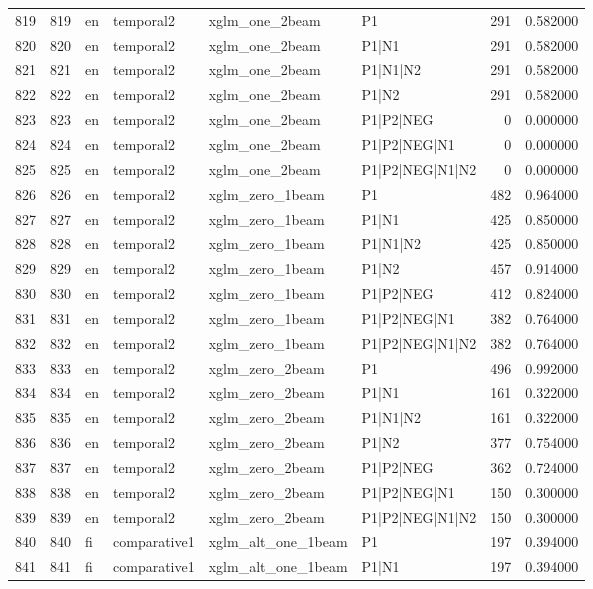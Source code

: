 \begin{tabular}{lrllllrr}
819 & 819 & en & temporal2 & xglm_one_2beam & P1 & 291 & 0.582000 \\
820 & 820 & en & temporal2 & xglm_one_2beam & P1|N1 & 291 & 0.582000 \\
821 & 821 & en & temporal2 & xglm_one_2beam & P1|N1|N2 & 291 & 0.582000 \\
822 & 822 & en & temporal2 & xglm_one_2beam & P1|N2 & 291 & 0.582000 \\
823 & 823 & en & temporal2 & xglm_one_2beam & P1|P2|NEG & 0 & 0.000000 \\
824 & 824 & en & temporal2 & xglm_one_2beam & P1|P2|NEG|N1 & 0 & 0.000000 \\
825 & 825 & en & temporal2 & xglm_one_2beam & P1|P2|NEG|N1|N2 & 0 & 0.000000 \\
826 & 826 & en & temporal2 & xglm_zero_1beam & P1 & 482 & 0.964000 \\
827 & 827 & en & temporal2 & xglm_zero_1beam & P1|N1 & 425 & 0.850000 \\
828 & 828 & en & temporal2 & xglm_zero_1beam & P1|N1|N2 & 425 & 0.850000 \\
829 & 829 & en & temporal2 & xglm_zero_1beam & P1|N2 & 457 & 0.914000 \\
830 & 830 & en & temporal2 & xglm_zero_1beam & P1|P2|NEG & 412 & 0.824000 \\
831 & 831 & en & temporal2 & xglm_zero_1beam & P1|P2|NEG|N1 & 382 & 0.764000 \\
832 & 832 & en & temporal2 & xglm_zero_1beam & P1|P2|NEG|N1|N2 & 382 & 0.764000 \\
833 & 833 & en & temporal2 & xglm_zero_2beam & P1 & 496 & 0.992000 \\
834 & 834 & en & temporal2 & xglm_zero_2beam & P1|N1 & 161 & 0.322000 \\
835 & 835 & en & temporal2 & xglm_zero_2beam & P1|N1|N2 & 161 & 0.322000 \\
836 & 836 & en & temporal2 & xglm_zero_2beam & P1|N2 & 377 & 0.754000 \\
837 & 837 & en & temporal2 & xglm_zero_2beam & P1|P2|NEG & 362 & 0.724000 \\
838 & 838 & en & temporal2 & xglm_zero_2beam & P1|P2|NEG|N1 & 150 & 0.300000 \\
839 & 839 & en & temporal2 & xglm_zero_2beam & P1|P2|NEG|N1|N2 & 150 & 0.300000 \\
840 & 840 & fi & comparative1 & xglm_alt_one_1beam & P1 & 197 & 0.394000 \\
841 & 841 & fi & comparative1 & xglm_alt_one_1beam & P1|N1 & 197 & 0.394000 \\

\end{tabular}
